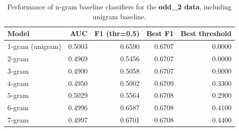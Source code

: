 \begin{table}
\caption{Performance of n-gram baseline classifiers for the \textbf{odd_2 data}, including unigram baseline.}
\label{tab:ngram_baselines}
\begin{tabular}{lrrrr}
\toprule
Model & AUC & F1 (thr=0.5) & Best F1 & Best threshold \\
\midrule
1-gram (unigram) & 0.5003 & 0.6590 & 0.6707 & 0.0000 \\
2-gram & 0.4969 & 0.5456 & 0.6707 & 0.0000 \\
3-gram & 0.4900 & 0.5058 & 0.6707 & 0.0000 \\
4-gram & 0.4950 & 0.5002 & 0.6709 & 0.3300 \\
5-gram & 0.5029 & 0.5564 & 0.6708 & 0.2900 \\
6-gram & 0.4996 & 0.6587 & 0.6708 & 0.4100 \\
7-gram & 0.4997 & 0.6701 & 0.6708 & 0.4400 \\
\bottomrule
\end{tabular}
\end{table}
